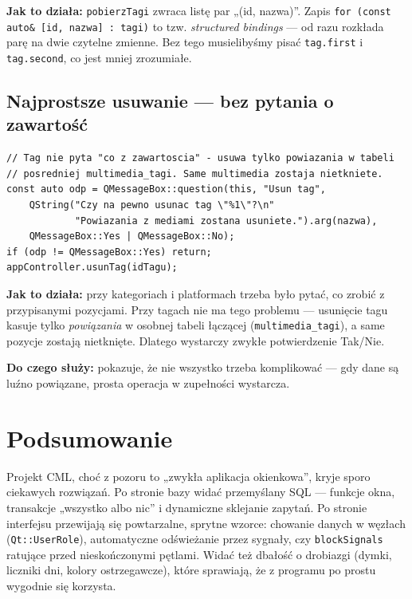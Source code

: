 \documentclass[11pt,a4paper]{article}
\begin{document}
\textbf{Jak to działa:} \texttt{pobierzTagi} zwraca listę par „(id, nazwa)”.
Zapis \texttt{for (const auto\& [id, nazwa] : tagi)} to tzw. \emph{structured
bindings} --- od razu rozkłada parę na dwie czytelne zmienne. Bez tego musielibyśmy
pisać \texttt{tag.first} i \texttt{tag.second}, co jest mniej zrozumiałe.

\subsection{Najprostsze usuwanie --- bez pytania o zawartość}

\begin{lstlisting}[caption={Usunięcie tagu kasuje tylko powiązania}]
// Tag nie pyta "co z zawartoscia" - usuwa tylko powiazania w tabeli
// posredniej multimedia_tagi. Same multimedia zostaja nietkniete.
const auto odp = QMessageBox::question(this, "Usun tag",
    QString("Czy na pewno usunac tag \"%1\"?\n"
            "Powiazania z mediami zostana usuniete.").arg(nazwa),
    QMessageBox::Yes | QMessageBox::No);
if (odp != QMessageBox::Yes) return;
appController.usunTag(idTagu);
\end{lstlisting}

\textbf{Jak to działa:} przy kategoriach i platformach trzeba było pytać, co zrobić
z przypisanymi pozycjami. Przy tagach nie ma tego problemu --- usunięcie tagu
kasuje tylko \emph{powiązania} w osobnej tabeli łączącej (\texttt{multimedia\_tagi}),
a same pozycje zostają nietknięte. Dlatego wystarczy zwykłe potwierdzenie Tak/Nie.

\textbf{Do czego służy:} pokazuje, że nie wszystko trzeba komplikować --- gdy dane
są luźno powiązane, prosta operacja w zupełności wystarcza.

\section{Podsumowanie}

Projekt CML, choć z pozoru to „zwykła aplikacja okienkowa”, kryje sporo ciekawych
rozwiązań. Po stronie bazy widać przemyślany SQL --- funkcje okna, transakcje
„wszystko albo nic” i dynamiczne sklejanie zapytań. Po stronie interfejsu
przewijają się powtarzalne, sprytne wzorce: chowanie danych w węzłach
(\texttt{Qt::UserRole}), automatyczne odświeżanie przez sygnały, czy
\texttt{blockSignals} ratujące przed nieskończonymi pętlami. Widać też dbałość
o drobiazgi (dymki, liczniki dni, kolory ostrzegawcze), które sprawiają, że
z programu po prostu wygodnie się korzysta.
\end{document}
